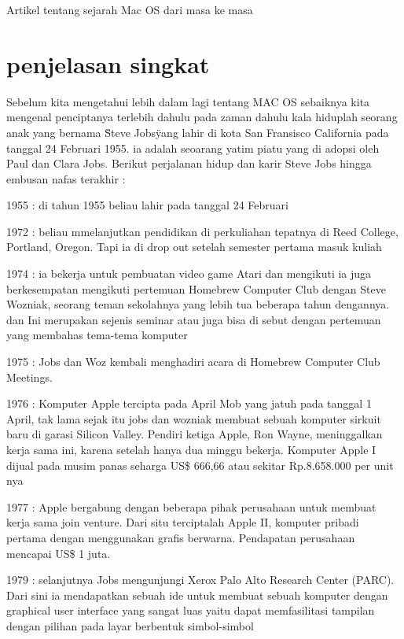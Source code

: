 



Artikel tentang sejarah Mac OS dari masa ke masa

\section{penjelasan singkat}
Sebelum kita mengetahui lebih dalam lagi tentang MAC OS sebaiknya kita mengenal penciptanya terlebih dahulu
pada zaman dahulu kala hiduplah seorang anak yang bernama \"Steve Jobs\" yang lahir di kota San Fransisco California 
pada tanggal 24 Februari 1955. ia adalah seoarang yatim piatu yang di adopsi oleh Paul dan Clara Jobs.
Berikut perjalanan hidup dan karir Steve Jobs hingga embusan nafas terakhir : 

1955 : di tahun 1955 beliau lahir pada tanggal 24 Februari

1972 : beliau mmelanjutkan pendidikan di perkuliahan tepatnya di Reed College, Portland, Oregon. Tapi ia di drop out setelah semester pertama masuk kuliah

1974 : ia bekerja untuk pembuatan video game Atari dan mengikuti ia juga berkesempatan mengikuti pertemuan Homebrew Computer Club dengan Steve Wozniak, seorang teman sekolahnya yang lebih tua beberapa tahun dengannya. dan Ini merupakan sejenis seminar atau juga bisa di sebut dengan pertemuan yang membahas tema-tema komputer

1975 : Jobs dan Woz kembali menghadiri acara di Homebrew Computer Club Meetings. 

1976 : Komputer Apple tercipta pada April Mob yang jatuh pada tanggal 1 April, tak lama sejak itu jobs dan wozniak membuat sebuah komputer sirkuit baru di garasi Silicon Valley. Pendiri ketiga Apple, Ron Wayne, meninggalkan kerja sama ini, karena setelah hanya dua minggu bekerja. Komputer Apple I dijual pada musim panas seharga US\$ 666,66 atau sekitar Rp.8.658.000 per unit nya

1977 : Apple bergabung dengan beberapa pihak perusahaan untuk membuat kerja sama join venture. Dari situ terciptalah Apple II, komputer pribadi pertama dengan menggunakan grafis berwarna. Pendapatan perusahaan mencapai US\$ 1 juta.

1979 : selanjutnya Jobs mengunjungi Xerox Palo Alto Research Center (PARC). Dari sini ia mendapatkan sebuah ide untuk membuat sebuah komputer dengan graphical user interface yang sangat luas yaitu dapat memfasilitasi tampilan dengan pilihan pada layar berbentuk simbol-simbol 

